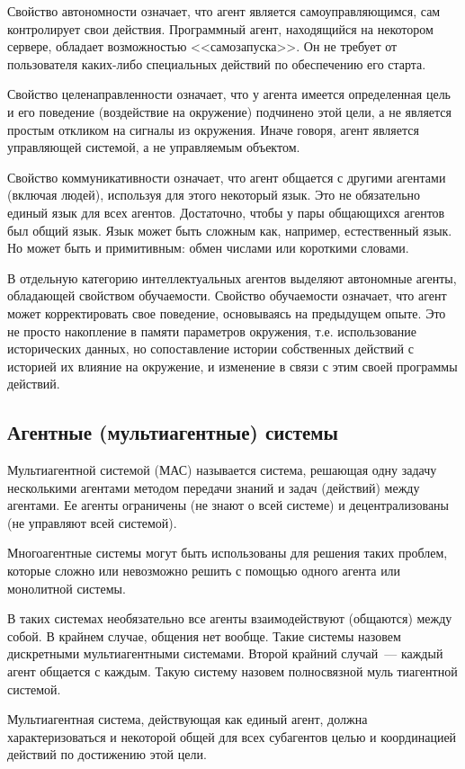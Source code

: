 Свойство автономности означает, что агент является самоуправляющимся, сам контролирует свои действия. Программный агент, находящийся на некотором сервере, обладает возможностью <<самозапуска>>. Он не требует от пользователя каких-либо специальных действий по обеспечению его старта.

Свойство целенаправленности означает, что у агента имеется определенная цель и его поведение (воздействие на окружение) подчинено этой цели, а не является простым откликом на сигналы из окружения. Иначе говоря, агент является управляющей системой, а не управляемым объектом.

Свойство коммуникативности означает, что агент общается с другими агентами (включая людей), используя для этого некоторый язык. Это не обязательно единый язык для всех агентов. Достаточно, чтобы у пары общающихся агентов был общий язык. Язык может быть сложным как, например, естественный язык. Но может быть и примитивным: обмен числами или короткими словами.

В отдельную категорию интеллектуальных агентов выделяют автономные агенты, обладающей свойством обучаемости. Свойство обучаемости означает, что агент может корректировать свое поведение, основываясь на предыдущем опыте. Это не просто накопление в памяти параметров окружения, т.е. использование исторических данных, но сопоставление истории собственных действий с историей их влияние на окружение, и изменение в связи с этим своей программы действий.

\subsection{Агентные (мультиагентные) системы}
Мультиагентной системой (МАС) называется система, решающая одну задачу несколькими агентами методом передачи знаний и задач (действий) между агентами. Ее агенты ограничены (не знают о всей системе) и децентрализованы (не управляют всей системой).

Многоагентные системы могут быть использованы для решения таких проблем, которые сложно или невозможно решить с помощью одного агента или монолитной системы.

В таких системах необязательно все агенты взаимодействуют (общаются) между собой. В крайнем случае, общения нет вообще. Такие системы назовем дискретными мультиагентными системами. Второй крайний случай~--- каждый агент общается с каждым. Такую систему назовем полносвязной муль тиагентной системой.

Мультиагентная система, действующая как единый агент, должна характеризоваться и некоторой общей для всех субагентов целью и координацией действий по достижению этой цели.

